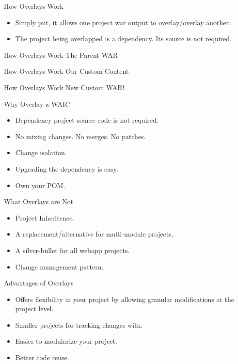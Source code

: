 \documentclass[xcolor=dvipsnames,14pt,professionalfonts]{beamer}
\begin{document}
\begin{frame}{How Overlays Work}
  \begin{itemize}
    \item Simply put, it allows one project war output to
      overlay/overlay another.
    \item The project being overlapped is a dependency. Its source is
      not required.
  \end{itemize}
  \end{frame}
\begin{frame}{How Overlays Work}
    The Parent WAR 
\end{frame}

\begin{frame}{How Overlays Work}
     Our Custom Content 
\end{frame}

\begin{frame}{How Overlays Work}
     New Custom WAR! 
\end{frame}

\begin{frame}{Why Overlay a WAR?}
  \begin{itemize}
    \item Dependency project source code is not required.
    \item No mixing changes. No merges. No patches.
    \item Change isolation.
    \item Upgrading the dependency is easy.
    \item Own your POM.
  \end{itemize}
\end{frame}

\begin{frame}{What Overlays are Not}
  \begin{itemize}
  \item Project Inheritence.
  \item A replacement/alternative for multi-module projects.
  \item A silver-bullet for all webapp projects.
  \item Change management pattern.
  \end{itemize}
\end{frame}


\begin{frame}{Advantages of Overlays}
  \begin{itemize}
    \item Offers flexibility in your project by allowing granular
      modifications at the project level.
    \item Smaller projects for tracking changes with.
    \item Easier to modularize your project.
    \item Better code reuse.
  \end{itemize}
\end{frame}
\end{document}
